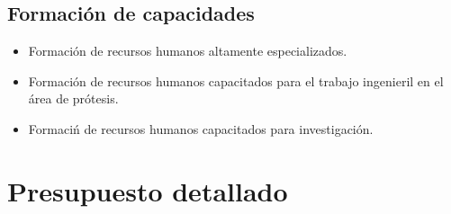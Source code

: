 \documentclass[12pt,a4paper]{article}
\begin{document}
\subsection{Formación de capacidades}
\begin{itemize}
\item Formación de recursos humanos altamente especializados.
\item Formación de recursos humanos capacitados para el trabajo ingenieril en el área de prótesis.
\item Formaciń de recursos humanos capacitados para investigación.  
\end{itemize}

\section{Presupuesto detallado}
\end{document}
